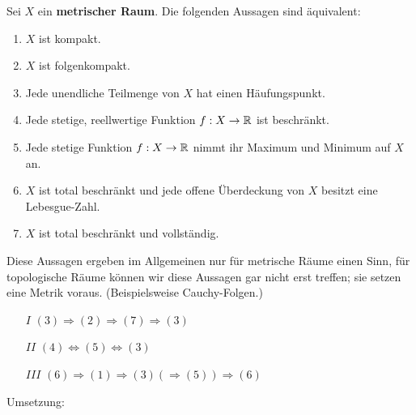 \documentclass[main.tex]{subfiles}
\begin{document}
\begin{Theorem}
  Sei $X$ ein \textbf{metrischer Raum}. Die folgenden Aussagen sind äquivalent:
  \begin{enumerate}
    \item $X$ ist kompakt.
    \item $X$ ist folgenkompakt.
    \item Jede unendliche Teilmenge von $X$ hat einen Häufungspunkt.
    \item Jede stetige, reellwertige Funktion $f: X \to \mathbb{R}$ ist beschränkt.
    \item Jede stetige Funktion $f: X \to \mathbb{R}$ nimmt ihr Maximum und Minimum auf $X$ an.
    \item $X$ ist total beschränkt und jede offene Überdeckung von $X$ besitzt eine Lebesgue-Zahl.
    \item $X$ ist total beschränkt und vollständig.
  \end{enumerate}
\end{Theorem}

\begin{Bemerkung}
  Diese Aussagen ergeben im Allgemeinen nur für metrische Räume einen Sinn, für topologische Räume können wir diese Aussagen gar nicht erst treffen; sie setzen eine Metrik voraus. (Beispielsweise Cauchy-Folgen.)
\end{Bemerkung}

\begin{Beweis}[Vorausschau]
  \begin{itemize}
    \item[$I$] $(3) \Rightarrow (2) \Rightarrow (7) \Rightarrow (3)$
    \item[$II$] $(4) \Leftrightarrow (5) \Leftrightarrow (3)$
    \item[$III$] $(6) \Rightarrow (1) \Rightarrow (3) (\Rightarrow (5)) \Rightarrow (6)$
  \end{itemize}
\end{Beweis}
Umsetzung:
\end{document}
